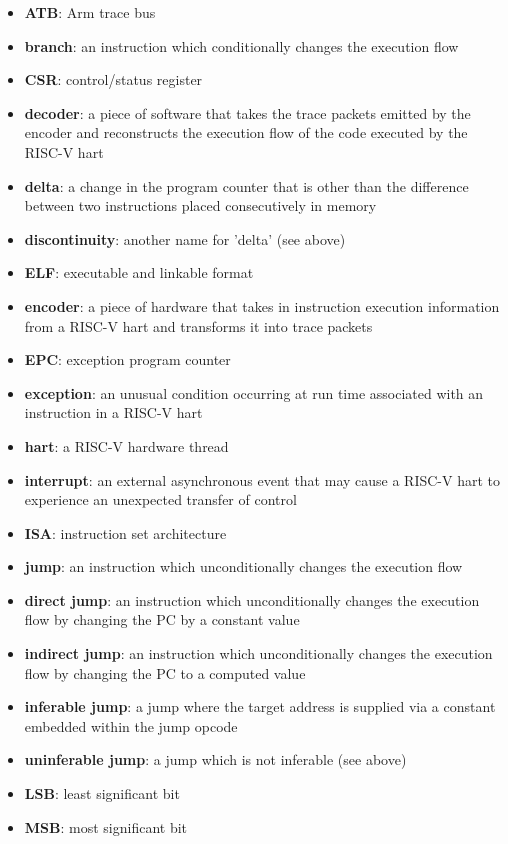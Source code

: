\begin{itemize}
  \item \textbf{ATB}: Arm trace bus
  \item \textbf{branch}: an instruction which conditionally changes the execution flow
  \item \textbf{CSR}: control/status register
  \item \textbf{decoder}: a piece of software that takes the trace packets emitted by the encoder and 
    reconstructs the execution flow of the code executed by the RISC-V hart
  \item \textbf{delta}: a change in the program counter that is other than the difference between two instructions placed consecutively in memory
  \item \textbf{discontinuity}: another name for 'delta' (see above)
  \item \textbf{ELF}: executable and linkable format
  \item \textbf{encoder}: a piece of hardware that takes in instruction execution information from a RISC-V hart and transforms it into trace packets
  \item \textbf{EPC}: exception program counter
  \item \textbf{exception}: an unusual condition occurring at run time associated with an instruction in a RISC-V hart
  \item \textbf{hart}: a RISC-V hardware thread
  \item \textbf{interrupt}: an external asynchronous event that may cause a RISC-V hart to experience an unexpected transfer of control
  \item \textbf{ISA}: instruction set architecture
  \item \textbf{jump}: an instruction which unconditionally changes the execution flow
  \item \textbf{direct jump}: an instruction which unconditionally changes the execution flow by changing the PC by a constant value
  \item \textbf{indirect jump}: an instruction which unconditionally changes the execution flow by changing the PC to a computed value
  \item \textbf{inferable jump}: a jump where the target address is supplied via a constant embedded within the jump opcode
  \item \textbf{uninferable jump}: a jump which is not inferable (see above)
  \item \textbf{LSB}: least significant bit
  \item \textbf{MSB}: most significant bit

\end{itemize}
